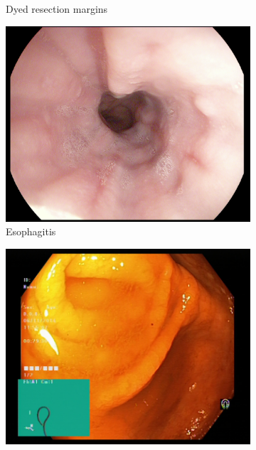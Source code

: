\begin{figure}
\begin{subfigure}[b]{0.4\textwidth}
            \caption{{\small Dyed resection margins }}    
            \label{fig:kvasir-dyed-resection-margins}
        \end{subfigure}
        \qquad\vfill%
        \begin{subfigure}[b]{0.4\textwidth}   
            \centering 
            \includegraphics[width=\textwidth]{experiments/images/esophagitis.jpg}
            \caption{{\small Esophagitis}}    
            \label{fig:kvasir-esophagitis}
        \end{subfigure}
        \qquad%
        \begin{subfigure}[b]{0.4\textwidth}   
            \centering 
            \includegraphics[width=\textwidth]{experiments/images/normal-cecum.jpg}

\end{subfigure}
\end{figure}
